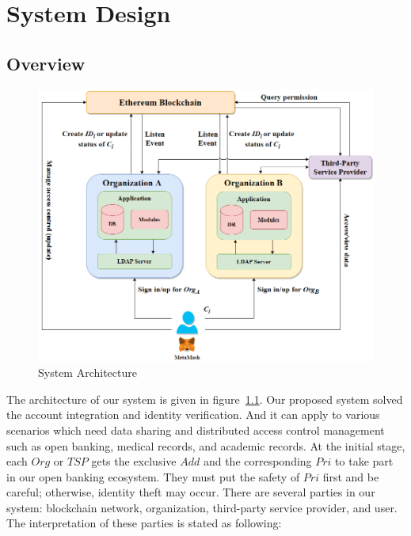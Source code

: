 \chapter{System Design}
\label{chapter:design}

\section{Overview}
    
    \newpage    

    \begin{figure}[htb]
        \centering
        \includegraphics[height=!,width=1\linewidth,keepaspectratio=true]{figures/system_architecture.png}
        \caption{{\footnotesize System Architecture}}
        \label{fig:system_architecture}
    \end{figure}
    The architecture of our system is given in figure~\ref{fig:system_architecture}. Our proposed system solved the account integration and identity verification. And it can apply to various scenarios which need data sharing and distributed access control management such as open banking, medical records, and academic records. At the initial stage, each \(Org\) or \(TSP\) gets the exclusive \(Add\) and the corresponding \(Pri\) to take part in our open banking ecosystem. They must put the safety of \(Pri\) first and be careful; otherwise, identity theft may occur. There are several parties in our system: blockchain network, organization, third-party service provider, and user. The interpretation of these parties is stated as following:\par

